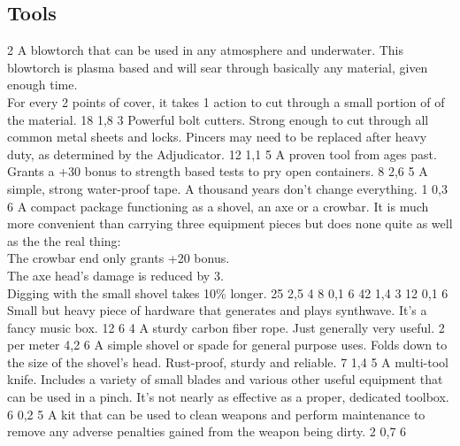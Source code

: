 \subsection{Tools}
\vspace{10mm}
\begin{multicols}{2}
    {A blowtorch that can be used in any atmosphere and underwater.
        This blowtorch is plasma based
        and will sear through basically any material,
        given enough time.\\
        For every 2 points of cover,
        it takes 1 action to cut through a small portion of of the material.}
    {18}
    {1,8}
    {3}
    {Powerful bolt cutters.
        Strong enough to cut through all common metal sheets and locks.
        Pincers may need to be replaced after heavy duty, as determined by the Adjudicator.}
    {12}
    {1,1}
    {5}
    {A proven tool from ages past.
        Grants a +30 bonus to strength based tests to pry open containers.}
    {8}
    {2,6}
    {5}
    {A simple, strong water-proof tape.
        A thousand years don't change everything.}
    {1}
    {0,3}
    {6}
    {A compact package functioning as
        a shovel,
        an axe
        or a crowbar.
        It is much more convenient than carrying three equipment pieces
        but does none quite as well as the the real thing:\\
	The crowbar end only grants +20 bonus.\\
	The axe head's damage is reduced by 3.\\
	Digging with the small shovel takes 10\% longer.}
    {25}
    {2,5}
    {4}
    {8}
    {0,1}
    {6}
    {42}
    {1,4}
    {3}
    {12}
    {0,1}
    {6}
    {Small but heavy piece of hardware that generates and plays synthwave.
        It’s a fancy music box.}
    {12}
    {6}
    {4}
    {A sturdy carbon fiber rope. Just generally very useful.}
    {2 per meter}
    {4,2}
    {6}
    {A simple shovel or spade for general purpose uses.
        Folds down to the size of the shovel’s head.
        Rust-proof, sturdy and reliable.}
    {7}
    {1,4}
    {5}
    {A multi-tool knife.
        Includes a variety of small blades and various other useful equipment
        that can be used in a pinch.
        It's not nearly as effective as a proper, dedicated toolbox.}
    {6}
    {0,2}
    {5}
    {A kit that can be used to clean weapons and perform maintenance
        to remove any adverse penalties gained from the weapon being dirty.}
    {2}
    {0,7}
    {6}
\end{multicols}

